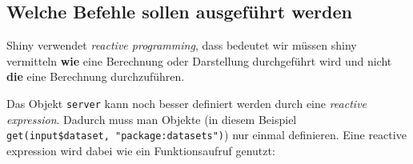 \documentclass[
]{article}
\newenvironment{Shaded}{\begin{snugshade}}{\end{snugshade}}
\newcommand{\CommentTok}[1]{\textcolor[rgb]{0.56,0.35,0.01}{\textit{#1}}}
\newcommand{\ControlFlowTok}[1]{\textcolor[rgb]{0.13,0.29,0.53}{\textbf{#1}}}
\newcommand{\FunctionTok}[1]{\textcolor[rgb]{0.00,0.00,0.00}{#1}}
\newcommand{\NormalTok}[1]{#1}
\newcommand{\OtherTok}[1]{\textcolor[rgb]{0.56,0.35,0.01}{#1}}
\newcommand{\SpecialCharTok}[1]{\textcolor[rgb]{0.00,0.00,0.00}{#1}}
\newcommand{\StringTok}[1]{\textcolor[rgb]{0.31,0.60,0.02}{#1}}
\begin{document}
\hypertarget{welche-befehle-sollen-ausgefuxfchrt-werden}{%
\subsection{Welche Befehle sollen ausgeführt werden}\label{welche-befehle-sollen-ausgefuxfchrt-werden}}

Shiny verwendet \emph{reactive programming}, dass bedeutet wir müssen shiny vermitteln \textbf{wie} eine Berechnung oder Darstellung durchgeführt wird und nicht \textbf{die} eine Berechnung durchzuführen.

\begin{Shaded}
\end{Shaded}

Das Objekt \texttt{server} kann noch besser definiert werden durch eine \emph{reactive expression}. Dadurch muss man Objekte (in diesem Beispiel \texttt{get(input\$dataset,\ "package:datasets")}) nur einmal definieren. Eine reactive expression wird dabei wie ein Funktionsaufruf genutzt:
\end{document}
